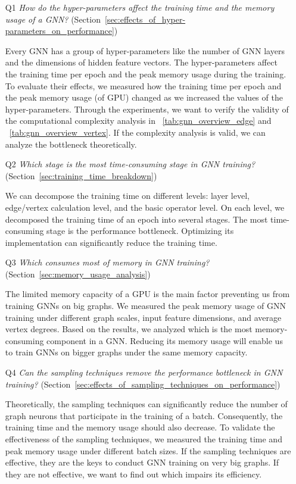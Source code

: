 \begin{itemize}

    \item[Q1] \emph{How do the hyper-parameters affect the training time and the memory usage of a GNN?} (Section~\ref{sec:effects_of_hyper-parameters_on_performance})

          Every GNN has a group of hyper-parameters like the number of GNN layers and the dimensions of hidden feature vectors. The hyper-parameters affect the training time per epoch and the peak memory usage during the training.
          To evaluate their effects, we measured how the training time per epoch and the peak memory usage (of GPU) changed as we increased the values of the hyper-parameters.
          Through the experiments, we want to verify the validity of the computational complexity analysis in \tablename~\ref{tab:gnn_overview_edge} and \tablename~\ref{tab:gnn_overview_vertex}.
          If the complexity analysis is valid, we can analyze the bottleneck theoretically.

    \item[Q2] \emph{Which stage is the most time-consuming stage in GNN training?} (Section~\ref{sec:training_time_breakdown})

          We can decompose the training time on different levels: layer level, edge/vertex calculation level, and the basic operator level.
          On each level, we decomposed the training time of an epoch into several stages. The most time-consuming stage is the performance bottleneck.
          Optimizing its implementation can significantly reduce the training time.

    \item[Q3] \emph{Which consumes most of memory in GNN training?} (Section~\ref{sec:memory_usage_analysis})

          The limited memory capacity of a GPU is the main factor preventing us from training GNNs on big graphs.
          We measured the peak memory usage of GNN training under different graph scales, input feature dimensions, and average vertex degrees.
          Based on the results, we analyzed which is the most memory-consuming component in a GNN.
          Reducing its memory usage will enable us to train GNNs on bigger graphs under the same memory capacity.

    \item[Q4] \emph{Can the sampling techniques remove the performance bottleneck in GNN training?} (Section~\ref{sec:effects_of_sampling_techniques_on_performance})

          Theoretically, the sampling techniques can significantly reduce the number of graph neurons that participate in the training of a batch.
          Consequently, the training time and the memory usage should also decrease.
          To validate the effectiveness of the sampling techniques, we measured the training time and peak memory usage under different batch sizes.
          If the sampling techniques are effective, they are the keys to conduct GNN training on very big graphs.
          If they are not effective, we want to find out which impairs its efficiency.
\end{itemize}

